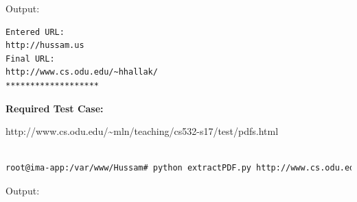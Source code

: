 \documentclass[a4paper, 11pt]{article}
\begin{document}
Output:

\begin{lstlisting}[language=bash]
Entered URL:
http://hussam.us
Final URL:
http://www.cs.odu.edu/~hhallak/
*******************
\end{lstlisting}

\noindent
\textbf{Required Test Case:}

http://www.cs.odu.edu/\textasciitilde mln/teaching/cs532-s17/test/pdfs.html
\begin{lstlisting}[language=bash]

root@ima-app:/var/www/Hussam# python extractPDF.py http://www.cs.odu.edu/~mln/teaching/cs532-s17/test/pdfs.html

\end{lstlisting}

Output:
\end{document}
